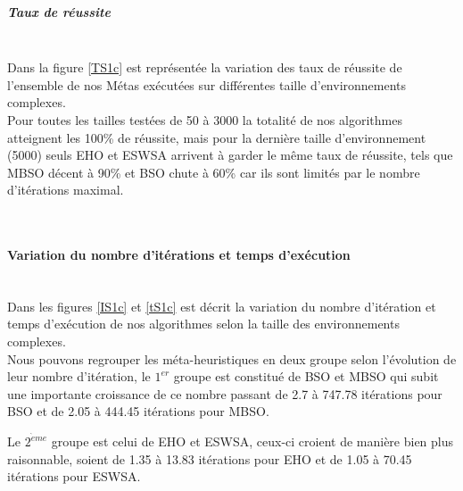 \noindent
\begin{minipage}[t]{0.5\textwidth}
	\subparagraph{Taux de réussite}
	\textbf{}\\
	
	Dans la figure \ref{TS1c} est représentée la variation des taux de réussite de l'ensemble de nos Métas exécutées sur différentes taille d'environnements complexes.\\
	
	Pour toutes les tailles testées de 50 à 3000 la totalité de nos algorithmes atteignent les 100\% de réussite, mais pour la dernière taille d'environnement (5000) seuls EHO et ESWSA arrivent à garder le même taux de réussite, tels que MBSO décent à 90\% et BSO chute à 60\% car ils sont limités par le nombre d'itérations maximal.
	
\end{minipage}\hfill
\begin{minipage}[t]{0.55\textwidth}
	\captionsetup{width=0.8\linewidth}
	\centering{}
	\label{TS1c}
\end{minipage}\hfill



\textbf{ }\\


\noindent
	\paragraph{Variation du nombre d'itérations et temps d'exécution}
	\textbf{ }\\
	
	Dans les figures \ref{IS1c} et \ref{tS1c} est décrit la variation du nombre d'itération et temps d'exécution de nos algorithmes selon la taille des environnements complexes.\\
	
	Nous pouvons regrouper les méta-heuristiques en deux groupe selon l'évolution de leur nombre d'itération, le $1^{er}$ groupe est constitué de BSO et MBSO qui subit une importante croissance de ce nombre passant de 2.7 à 747.78 itérations pour BSO et de 2.05 à 444.45 itérations pour MBSO.
	
	Le $2^{\grave{e}me}$ groupe est celui de EHO et ESWSA, ceux-ci croient de manière bien plus raisonnable, soient de 1.35 à 13.83 itérations pour EHO et de 1.05 à 70.45 itérations pour ESWSA.\\
	
